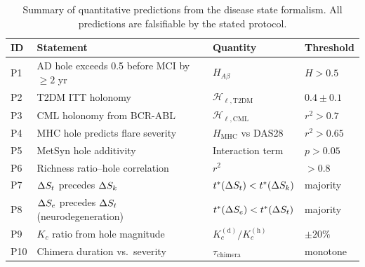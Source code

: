 \begin{table}[htbp]
\centering
\caption{Summary of quantitative predictions from the disease state
formalism.  All predictions are falsifiable by the stated protocol.}
\label{tab:ch07-predictions}
\small
\begin{tabular}{llll}
\hline
\textbf{ID} & \textbf{Statement} & \textbf{Quantity} & \textbf{Threshold} \\
\hline
P1 & AD hole exceeds 0.5 before MCI by $\geq 2$ yr & $H_{A\beta}$ & $H > 0.5$ \\
P2 & T2DM ITT holonomy & $\mathcal{H}_{\ell,\mathrm{T2DM}}$ & $0.4 \pm 0.1$ \\
P3 & CML holonomy from BCR-ABL & $\mathcal{H}_{\ell,\mathrm{CML}}$ & $r^2 > 0.7$ \\
P4 & MHC hole predicts flare severity & $H_{\mathrm{MHC}}$ vs DAS28 & $r^2 > 0.65$ \\
P5 & MetSyn hole additivity & Interaction term & $p > 0.05$ \\
P6 & Richness ratio--hole correlation & $r^2$ & $>0.8$ \\
P7 & $\Delta S_t$ precedes $\Delta S_k$ & $t^{*}(\Delta S_t) < t^{*}(\Delta S_k)$ & majority \\
P8 & $\Delta S_e$ precedes $\Delta S_t$ (neurodegeneration) & $t^{*}(\Delta S_e) < t^{*}(\Delta S_t)$ & majority \\
P9 & $K_c$ ratio from hole magnitude & $K_c^{(\mathrm{d})}/K_c^{(\mathrm{h})}$ & $\pm 20\%$ \\
P10 & Chimera duration vs.\ severity & $\tau_{\mathrm{chimera}}$ & monotone \\
\hline
\end{tabular}
\end{table}
